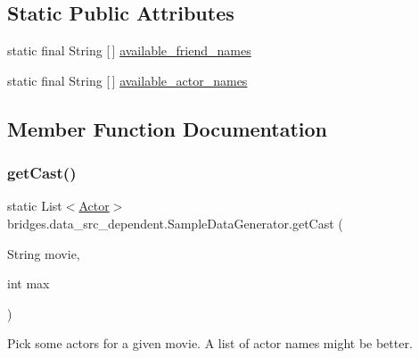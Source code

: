 \subsection*{Static Public Attributes}
\begin{DoxyCompactItemize}
\item 
static final String \mbox{[}$\,$\mbox{]} \mbox{\hyperlink{classbridges_1_1data__src__dependent_1_1_sample_data_generator_a304c946018534a5a2b0049aace9d4472}{available\+\_\+friend\+\_\+names}}
\item 
static final String \mbox{[}$\,$\mbox{]} \mbox{\hyperlink{classbridges_1_1data__src__dependent_1_1_sample_data_generator_aac86cadaeb8859e94b6ed47a066cbbfc}{available\+\_\+actor\+\_\+names}}
\end{DoxyCompactItemize}


\subsection{Member Function Documentation}
\mbox{\label{classbridges_1_1data__src__dependent_1_1_sample_data_generator_a2e5c2ea6214a140a50b375f4e859ed0d}} 
\subsubsection{\texorpdfstring{get\+Cast()}{getCast()}}
{\footnotesize\ttfamily static List$<$\mbox{\hyperlink{classbridges_1_1data__src__dependent_1_1_actor}{Actor}}$>$ bridges.\+data\+\_\+src\+\_\+dependent.\+Sample\+Data\+Generator.\+get\+Cast (\begin{DoxyParamCaption}\item[{String}]{movie,  }\item[{int}]{max }\end{DoxyParamCaption})\hspace{0.3cm}{\ttfamily [static]}}

Pick some actors for a given movie. A list of actor names might be better.


